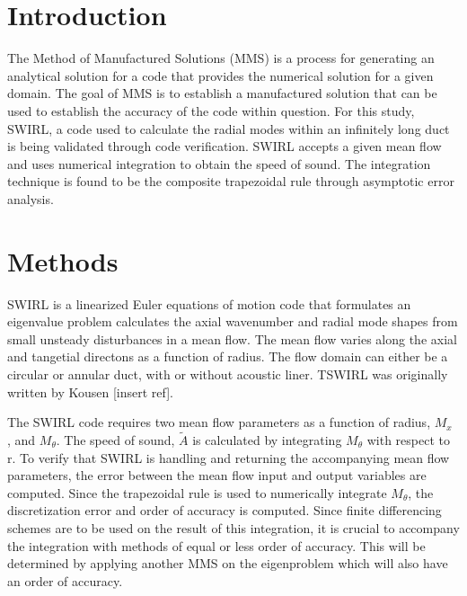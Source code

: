 \documentclass[12pt]{article}
\begin{document}







\section{Introduction}
The Method of Manufactured Solutions (MMS) is a process for generating an 
analytical solution for a code that provides the numerical solution for a 
given domain. The goal of MMS is to establish a manufactured solution that can 
be used to establish the accuracy of the code within question. For this study, 
SWIRL, a code used to calculate the radial modes within an infinitely long duct
is being validated through code verification. SWIRL accepts a given mean flow and 
uses numerical integration to obtain the speed of sound. The integration technique
is found to be the composite trapezoidal rule through asymptotic error analysis.


\section{Methods}

SWIRL is a linearized Euler equations of motion code that formulates an
eigenvalue problem calculates the 
axial wavenumber and radial mode shapes from small unsteady disturbances in a mean flow. 
The mean flow varies along the axial and tangetial directons as a function of 
radius. The flow domain can either be a circular or annular duct, with or without
acoustic liner. TSWIRL was originally written by Kousen [insert ref].

The SWIRL code requires two mean flow parameters as a function of radius, $M_x$
, and $M_{\theta}$. The speed of sound, $\widetilde{A}$ is calculated by 
integrating $M_{\theta}$ with respect to r. To verify that SWIRL is handling 
and returning the accompanying mean flow parameters, the error between the 
mean flow input and output variables are computed. Since the trapezoidal rule
is used to numerically integrate $M_{\theta}$, the discretization error and 
order of accuracy is computed. Since finite differencing schemes are to be used 
on the result of this integration, it is crucial to accompany the integration 
with methods of equal or less order of accuracy. This will be determined by 
applying another MMS on the eigenproblem which will also have an order of 
accuracy.
\end{document}
